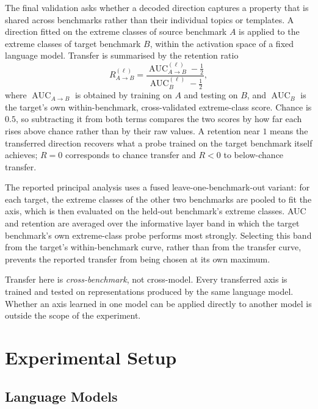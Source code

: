 The final validation asks whether a decoded direction captures a property that
is shared across benchmarks rather than their individual topics or templates.
A direction fitted on the extreme classes of source benchmark \(A\) is applied
to the extreme classes of target benchmark \(B\), within the activation space
of a fixed language model. Transfer is summarised by the retention ratio
\begin{equation}
  R_{A\rightarrow B}^{(\ell)}
  =\frac{\operatorname{AUC}_{A\rightarrow B}^{(\ell)}-\tfrac{1}{2}}
         {\operatorname{AUC}_{B}^{(\ell)}-\tfrac{1}{2}},
  \label{eq:transfer-retention}
\end{equation}
where \(\operatorname{AUC}_{A\rightarrow B}\) is obtained by training on
\(A\) and testing on \(B\), and \(\operatorname{AUC}_{B}\) is the target's own
within-benchmark, cross-validated extreme-class score. Chance is \(0.5\), so
subtracting it from both terms compares the two scores by how far each rises
above chance rather than by their raw values. A retention near \(1\) means the
transferred direction recovers what a probe trained on the target benchmark
itself achieves; \(R=0\) corresponds to chance transfer and \(R<0\) to
below-chance transfer.

The reported principal analysis uses a fused leave-one-benchmark-out variant:
for each target, the extreme classes of the other two benchmarks are pooled to
fit the axis, which is then evaluated on the held-out benchmark's extreme
classes. AUC and retention are averaged over the informative layer band in
which the target benchmark's own extreme-class probe performs most strongly.
Selecting this band from the target's within-benchmark curve, rather than from
the transfer curve, prevents the reported transfer from being chosen at its own
maximum.

Transfer here is \emph{cross-benchmark}, not cross-model. Every transferred
axis is trained and tested on representations produced by the same language
model. Whether an axis learned in one model can be applied directly to another
model is outside the scope of the experiment.

\section{Experimental Setup}
\label{sec:probing-experimental-setup}

\subsection{Language Models}
\label{subsec:probing-models}

